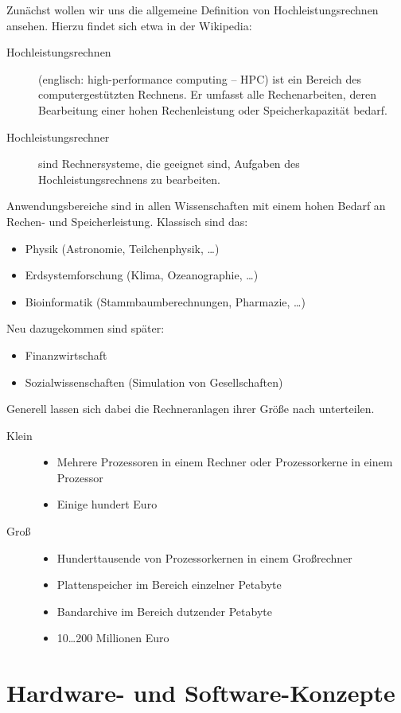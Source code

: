 \documentclass[10pt,oneside,a4paper]{scrartcl}
\begin{document}
Zunächst wollen wir uns die allgemeine Definition von Hochleistungsrechnen ansehen. Hierzu findet sich etwa in der Wikipedia:
\begin{description}
\item [Hochleistungsrechnen] (englisch: high-performance computing – HPC) ist ein Bereich des computergestützten Rechnens. Er umfasst alle Rechenarbeiten, deren Bearbeitung einer hohen Rechenleistung oder Speicherkapazität bedarf.
\item [Hochleistungsrechner] sind Rechnersysteme, die geeignet sind, Aufgaben des Hochleistungsrechnens zu bearbeiten.
\end{description}
Anwendungsbereiche sind in allen Wissenschaften mit einem hohen Bedarf an Rechen- und Speicherleistung.
Klassisch sind das:
\begin{itemize}
\item Physik (Astronomie, Teilchenphysik, …)
\item Erdsystemforschung (Klima, Ozeanographie, …)
\item Bioinformatik (Stammbaumberechnungen, Pharmazie, …)
\end{itemize}
Neu dazugekommen sind später:
\begin{itemize}
\item Finanzwirtschaft
\item Sozialwissenschaften (Simulation von Gesellschaften)
\end{itemize}
Generell lassen sich dabei die Rechneranlagen ihrer Größe nach unterteilen.
\begin{description}
\item[Klein]
  \begin{itemize}
  \item Mehrere Prozessoren in einem Rechner oder Prozessorkerne in einem Prozessor
  \item Einige hundert Euro
  \end{itemize}
\item[Groß]
  \begin{itemize}
  \item Hunderttausende von Prozessorkernen in einem Großrechner
  \item Plattenspeicher im Bereich einzelner Petabyte
  \item Bandarchive im Bereich dutzender Petabyte
  \item 10…200 Millionen Euro
  \end{itemize}
\end{description}
\section{Hardware- und Software-Konzepte}
\end{document}
